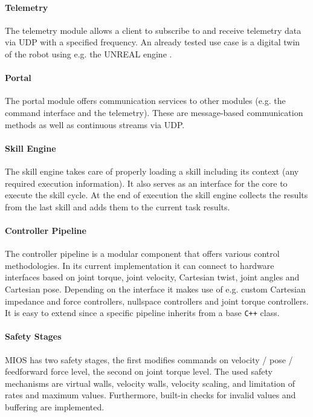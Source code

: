 \paragraph{Telemetry}
The telemetry module allows a client to subscribe to \softwareabbr{} and receive telemetry data via UDP with a specified frequency.
An already tested use case is a digital twin of the robot using e.g. the UNREAL engine \cite{EPICGames.2022}.

\paragraph{Portal}
The portal module offers communication services to other modules (e.g. the command interface and the telemetry).
These are message-based communication methods as well as continuous streams via UDP.

\paragraph{Skill Engine}
The skill engine takes care of properly loading a skill including its context (any required execution information).
It also serves as an interface for the core to execute the skill cycle.
At the end of execution the skill engine collects the results from the last skill and adds them to the current task results.

\paragraph{Controller Pipeline}
The controller pipeline is a modular component that offers various control methodologies.
In its current implementation it can connect to hardware interfaces based on joint torque, joint velocity, Cartesian twist, joint angles and Cartesian pose.
Depending on the interface it makes use of e.g. custom Cartesian impedance and force controllers, nullspace controllers and joint torque controllers.
It is easy to extend since a specific pipeline inherits from a base \verb!C++! class.

\paragraph{Safety Stages}
MIOS has two safety stages, the first modifies commands on velocity / pose / feedforward force level, the second on joint torque level.
The used safety mechanisms are virtual walls, velocity walls, velocity scaling, and limitation of rates and maximum values.
Furthermore, built-in checks for invalid values and buffering are implemented.

